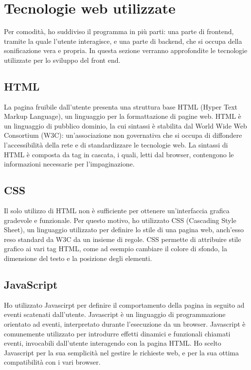 \section{Tecnologie web utilizzate}
Per comodità, ho suddiviso il programma in più parti: una parte di frontend, tramite la quale l'utente interagisce, e una parte di backend, che si occupa della sonificazione vera e propria.
In questa sezione verranno approfondite le tecnologie utilizzate per lo sviluppo del front end.

\subsection{HTML}
La pagina fruibile dall'utente presenta una struttura base HTML (Hyper Text Markup Language), un linguaggio per la formattazione di pagine web.
HTML è un linguaggio di pubblico dominio, la cui sintassi è stabilita dal World Wide Web Consortium (W3C): un'associazione non governativa che si occupa di diffondere l'accessibilità della rete e di standardizzare le tecnologie web.
La sintassi di HTML è composta da tag in cascata, i quali, letti dal browser, contengono le informazioni necessarie per l'impaginazione.

\subsection{CSS}
Il solo utilizzo di HTML non è sufficiente per ottenere un'interfaccia grafica gradevole e funzionale.
Per questo motivo, ho utilizzato CSS (Cascading Style Sheet), un linguaggio utilizzato per definire lo stile di una pagina web, anch'esso reso standard da W3C da un insieme di regole.
CSS permette di attribuire stile grafico ai vari tag HTML, come ad esempio cambiare il colore di sfondo, la dimensione del testo e la posizione degli elementi.

\subsection{JavaScript}
Ho utilizzato Javascirpt per definire il comportamento della pagina in seguito ad eventi scatenati dall'utente.
Javascript è un linguaggio di programmazione orientato ad eventi, interpretato durante l'esecuzione da un browser.
Javascript è comunemente utilizzato per introdurre effetti dinamici e funzionali chiamati eventi, invocabili dall'utente interagendo con la pagina HTML.
Ho scelto Javascript per la sua semplicità nel gestire le richieste web, e per la sua ottima compatibilità con i vari browser.

